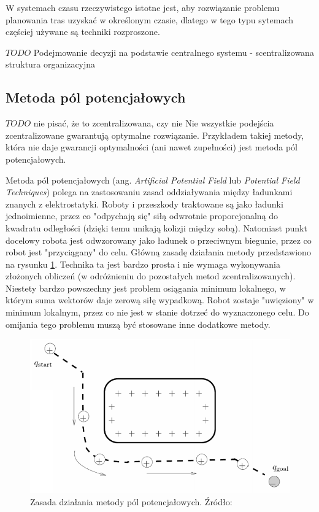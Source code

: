 W systemach czasu rzeczywistego istotne jest, aby rozwiązanie problemu planowania tras uzyskać w określonym czasie, dlatego w tego typu sytemach częściej używane są techniki rozproszone.

$TODO$ Podejmowanie decyzji na podstawie centralnego systemu - scentralizowana struktura organizacyjna

\subsection{Metoda pól potencjałowych}
$TODO$ nie pisać, że to zcentralizowana, czy nie
Nie wszystkie podejścia zcentralizowane gwarantują optymalne rozwiązanie. Przykładem takiej metody, która nie daje gwarancji optymalności (ani nawet zupełności) jest metoda pól potencjałowych.

Metoda pól potencjałowych (ang. {\it Artificial Potential Field} lub {\it Potential Field Techniques}) polega na zastosowaniu zasad oddziaływania między ładunkami znanych z elektrostatyki. Roboty i przeszkody traktowane są jako ładunki jednoimienne, przez co "odpychają się" siłą odwrotnie proporcjonalną do kwadratu odległości (dzięki temu unikają kolizji między sobą). Natomiast punkt docelowy robota jest odwzorowany jako ładunek o przeciwnym biegunie, przez co robot jest "przyciągany" do celu.
Główną zasadę działania metody przedstawiono na rysunku \ref{fig:image_potentialfield}.
Technika ta jest bardzo prosta i nie wymaga wykonywania złożonych obliczeń (w odróżnieniu do pozostałych metod zcentralizowanych). Niestety bardzo powszechny jest problem osiągania minimum lokalnego, w którym suma wektorów daje zerową siłę wypadkową. Robot zostaje "uwięziony" w minimum lokalnym, przez co nie jest w stanie dotrzeć do wyznaczonego celu. Do omijania tego problemu muszą być stosowane inne dodatkowe metody. \cite{potentialfield}
\begin{figure}[H]
	\centering
	\includegraphics[width=12cm]{img/potential-field}
	\caption{Zasada działania metody pól potencjałowych. Źródło: \cite{howie_potentialfield}}
	\label{fig:image_potentialfield}
\end{figure}

